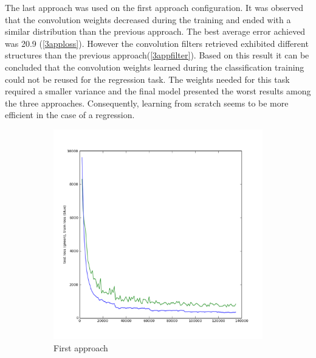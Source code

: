 The last approach was used on the first approach configuration. It was observed that the convolution weights decreased during the training and ended with a similar distribution than the previous approach. The best average error achieved was 20.9 (\ref{3apploss}). However the convolution filters retrieved exhibited different structures than the previous approach(\ref{3appfilter}). Based on this result it can be concluded that the convolution weights learned during the classification training could not be reused for the regression task. The weights needed for this task required a smaller variance and the final model presented the worst results among the three approaches. Consequently, learning from scratch seems to be more efficient in the case of a regression.


\begin{figure}[!h]
\centering
\begin{subfigure}{0.33\textwidth}
\label{1apploss}
\centering
\includegraphics[width=0.9\linewidth]{images/regression/test_loss_26_135000.png}
\caption{First approach}
\end{subfigure}%
\begin{subfigure}{0.33\textwidth}
\label{2apploss}
\centering

\end{subfigure}
\end{figure}
